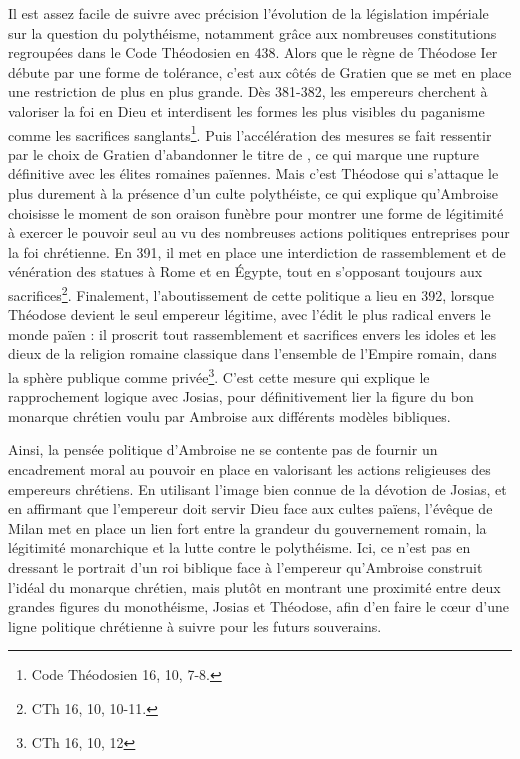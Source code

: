 Il est assez facile de suivre avec précision l'évolution de la législation impériale sur la question du polythéisme, notamment grâce aux nombreuses constitutions regroupées dans le Code Théodosien en 438. Alors que le règne de Théodose Ier débute par une forme de tolérance, c'est aux côtés de Gratien que se met en place une restriction de plus en plus grande. Dès 381-382, les empereurs cherchent à valoriser la foi en Dieu et interdisent les formes les plus visibles du paganisme comme les sacrifices sanglants\footnote{Code Théodosien 16, 10, 7-8.}. Puis l'accélération des mesures se fait ressentir par le choix de Gratien d'abandonner le titre de , ce qui marque une rupture définitive avec les élites romaines païennes. Mais c'est Théodose qui s'attaque le plus durement à la présence d'un culte polythéiste, ce qui explique qu'Ambroise choisisse le moment de son oraison funèbre pour montrer une forme de légitimité à exercer le pouvoir seul au vu des nombreuses actions politiques entreprises pour la foi chrétienne. En 391, il met en place une interdiction de rassemblement et de vénération des statues à Rome et en Égypte, tout en s'opposant toujours aux sacrifices\footnote{CTh 16, 10, 10-11.}. Finalement, l'aboutissement de cette politique a lieu en 392, lorsque Théodose devient le seul empereur légitime, avec l'édit le plus radical envers le monde païen : il proscrit tout rassemblement et sacrifices envers les idoles et les dieux de la religion romaine classique dans l'ensemble de l'Empire romain, dans la sphère publique comme privée\footnote{CTh 16, 10, 12}. C'est cette mesure qui explique le rapprochement logique avec Josias, pour définitivement lier la figure du bon monarque chrétien voulu par Ambroise aux différents modèles bibliques.

\bigskip

Ainsi, la pensée politique d'Ambroise ne se contente pas de fournir un encadrement moral au pouvoir en place en valorisant les actions religieuses des empereurs chrétiens. En utilisant l'image bien connue de la dévotion de Josias, et en affirmant que l'empereur doit servir Dieu face aux cultes païens, l'évêque de Milan met en place un lien fort entre la grandeur du gouvernement romain, la légitimité monarchique et la lutte contre le polythéisme. Ici, ce n'est pas en dressant le portrait d'un roi biblique face à l'empereur qu'Ambroise construit l'idéal du monarque chrétien, mais plutôt en montrant une proximité entre deux grandes figures du monothéisme, Josias et Théodose, afin d'en faire le cœur d'une ligne politique chrétienne à suivre pour les futurs souverains.

